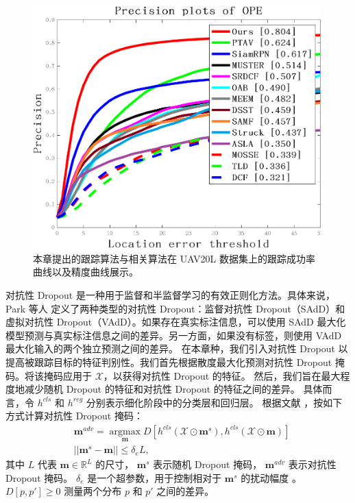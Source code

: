 \begin{figure}[t]
\begin{minipage}{0.48\textwidth}
  \centerline{\includegraphics[width=0.99\textwidth]{Img/end/quality_plot_error_OPE_threshold.png}}
\end{minipage}
\caption{本章提出的跟踪算法与相关算法在 UAV20L \cite{mueller2016benchmark} 数据集上的跟踪成功率曲线以及精度曲线展示。}
\label{fig:end_uav20l}
\end{figure}
对抗性 Dropout 是一种用于监督和半监督学习的有效正则化方法。具体来说，Park 等人 \cite{park2018adversarial} 定义了两种类型的对抗性 Dropout：监督对抗性 Dropout（SAdD）和虚拟对抗性 Dropout（VAdD）。如果存在真实标注信息，可以使用 SAdD 最大化模型预测与真实标注信息之间的差异。另一方面，如果没有标签，则使用 VAdD 最大化输入的两个独立预测之间的差异。%
在本章种，我们引入对抗性 Dropout 以提高被跟踪目标的特征判别性。我们首先根据散度最大化预测对抗性 Dropout 掩码。将该掩码应用于 $\mathcal{X}$，以获得对抗性 Dropout 的特征。
然后，我们旨在最大程度地减少随机 Dropout 的特征和对抗性 Dropout 的特征之间的差异。
具体而言，令 $h^{cls}$ 和 $h^{reg}$ 分别表示细化阶段中的分类层和回归层。
根据文献 \cite{lee2019drop}，按如下方式计算对抗性 Dropout 掩码：
\begin{equation}
\begin{split}
    & \mathbf{m}^{adv} = \mathop{\arg\max}\limits_{\mathbf{m}}D[h^{cls}(\mathcal{X} \odot \mathbf{m}^s), h^{cls}(\mathcal{X} \odot \mathbf{m})] \\
    & ||\mathbf{m}^s - \mathbf{m}|| \leq \delta_e L,
\end{split}
\end{equation}
其中 $L$ 代表 $\mathbf{m} \in \mathbb R^L$ 的尺寸，
$\mathbf{m}^s$ 表示随机 Dropout 掩码， $\mathbf{m}^{adv}$ 表示对抗性 Dropout 掩码。
$\delta_{e}$ 是一个超参数，用于控制相对于 $\mathbf{m}^{s}$ 的扰动幅度 \cite{lee2019drop}。
$D[p, p'] \geq 0$ 测量两个分布 $p$ 和 $p'$ 之间的差异。

